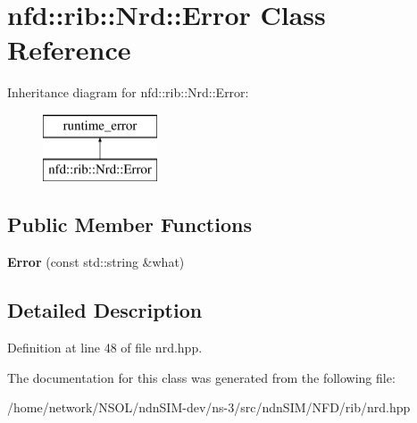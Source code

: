 \hypertarget{classnfd_1_1rib_1_1Nrd_1_1Error}{}\section{nfd\+:\+:rib\+:\+:Nrd\+:\+:Error Class Reference}
\label{classnfd_1_1rib_1_1Nrd_1_1Error}
Inheritance diagram for nfd\+:\+:rib\+:\+:Nrd\+:\+:Error\+:\begin{figure}[H]
\begin{center}
\leavevmode
\includegraphics[height=2.000000cm]{classnfd_1_1rib_1_1Nrd_1_1Error}
\end{center}
\end{figure}
\subsection*{Public Member Functions}
\begin{DoxyCompactItemize}
\item 
{\bfseries Error} (const std\+::string \&what)\hypertarget{classnfd_1_1rib_1_1Nrd_1_1Error_a60ba9c4b0c1cb9d198a867bebb1a624d}{}\label{classnfd_1_1rib_1_1Nrd_1_1Error_a60ba9c4b0c1cb9d198a867bebb1a624d}

\end{DoxyCompactItemize}


\subsection{Detailed Description}


Definition at line 48 of file nrd.\+hpp.



The documentation for this class was generated from the following file\+:\begin{DoxyCompactItemize}
\item 
/home/network/\+N\+S\+O\+L/ndn\+S\+I\+M-\/dev/ns-\/3/src/ndn\+S\+I\+M/\+N\+F\+D/rib/nrd.\+hpp\end{DoxyCompactItemize}
